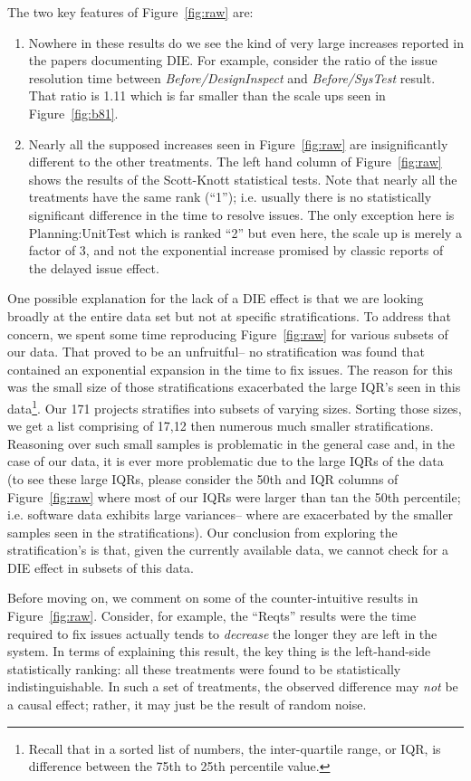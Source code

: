 \documentclass[smallcondensed]{svjour3}
\newcommand{\be}{\begin{enumerate}}
\newcommand{\ee}{\end{enumerate}}
\newcommand{\fig}[1]{Figure~\ref{fig:#1}}
\begin{document}
The two key features of \fig{raw} are:
\be
\item Nowhere in
these results do we see the kind of very large increases reported in the papers
documenting DIE. For example, consider the ratio of the issue resolution time
between {\em Before/DesignInspect} and {\em Before/SysTest} result. That ratio is 1.11 which is far smaller
than the scale ups seen in \fig{b81}.  
\item
Nearly all the supposed increases seen in \fig{raw} are insignificantly different
to the other treatments.  The left hand column of \fig{raw} shows the results of the Scott-Knott statistical tests. Note that nearly all
the treatments have the same rank (``1''); i.e. usually there is no statistically significant difference in the 
time to resolve issues. The only exception here is Planning:UnitTest which is ranked ``2'' but even here, the scale up is merely
a factor of 3, and not the exponential increase promised by classic reports of the delayed issue effect.
\ee
One possible explanation for the lack of a DIE effect is that we are looking
broadly at the entire data set but not at specific stratifications. To address that concern,
we spent some time reproducing \fig{raw} for various subsets of our data.
That proved to be an unfruitful-- no stratification was found that 
contained an exponential expansion in the time to fix issues. The reason for this was  the small size
of those stratifications  exacerbated the large IQR's seen in this data\footnote{Recall that in a sorted list of numbers,
the inter-quartile range, or IQR, is difference between the 
  75th to 25th percentile value.}.
Our 171 projects   stratifies into subsets of varying sizes. Sorting those sizes, we get a list
comprising of 17,12 then numerous much smaller stratifications.  Reasoning over such small samples
is problematic in the general case and, in the case of our data, it is ever more problematic due to
the large IQRs of the data
(to see these large IQRs,  please consider the 50th and IQR columns of Figure~\ref{fig:raw} where  most of our IQRs were larger than tan the 50th percentile; i.e. software
data exhibits large variances-- where are exacerbated by the smaller samples seen in the stratifications).
Our conclusion from exploring the stratification's is that, given the currently available data, we cannot check
for a DIE effect in subsets of this data.


Before moving on, we comment on some of the counter-intuitive
results in \fig{raw}. Consider, for example, the ``Reqts'' results were
the time required to fix issues actually tends to {\em decrease} the longer they are left in the system. In terms of explaining this result, the key thing is the left-hand-side statistically ranking: all these treatments were found to be statistically indistinguishable. In such a set of treatments, the observed
difference may {\em not} be a causal effect; rather, it may just
be the result of  random noise.
\end{document}

